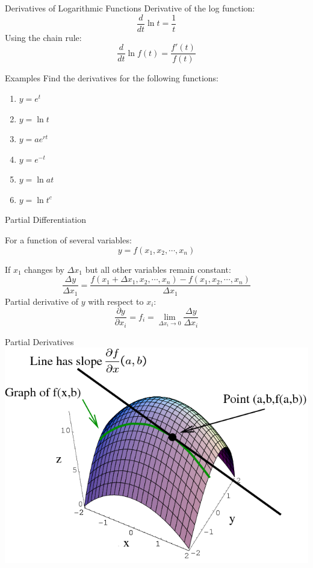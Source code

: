\documentclass{./../../Latex/teaching_slides}
\begin{document}
 \begin{frame}{Derivatives of Logarithmic Functions}
Derivative of the log function:
 $$ \frac{d}{d t} \ln t =\frac{1}{t} $$
Using the chain rule: 
 $$ \frac{d}{d t} \ln f(t) =\frac{f'(t)}{f(t)} $$
\end{frame}

\begin{frame}{Examples}
Find the derivatives for the following functions:\\
\begin{enumerate}
\item $y=e^t$
\item $y=\ln t$
\item $y=ae^{rt}$
\item $y=e^{-t}$
\item $y=\ln a t$
\item $y=\ln t^{c}$
\end{enumerate}
\end{frame}


\begin{frame}{Partial Differentiation}

For a function of several variables:
$$
y=f\left(x_{1}, x_{2}, \cdots, x_{n}\right)
$$

If $x_1$ changes by $\Delta x_1$ but all other variables remain constant: 
$$
\frac{\Delta y}{\Delta x_{1}}=\frac{f\left(x_{1}+\Delta x_1, x_{2}, \cdots, x_{n}\right)-f\left(x_{1}, x_{2}, \cdots, x_{n}\right)}{\Delta x_{1}}
$$
Partial derivative of $y$ with respect to $x_i$:
$$
\frac{\partial y}{\partial x_{i}}= f_i = \lim _{\Delta x_{i} \rightarrow 0} \frac{\Delta y}{\Delta x_{i}}
$$
\end{frame}

\begin{frame}{Partial Derivatives}
\centering
	\includegraphics[scale=0.45]{3dpartial.png}
\end{frame}
\end{document}
